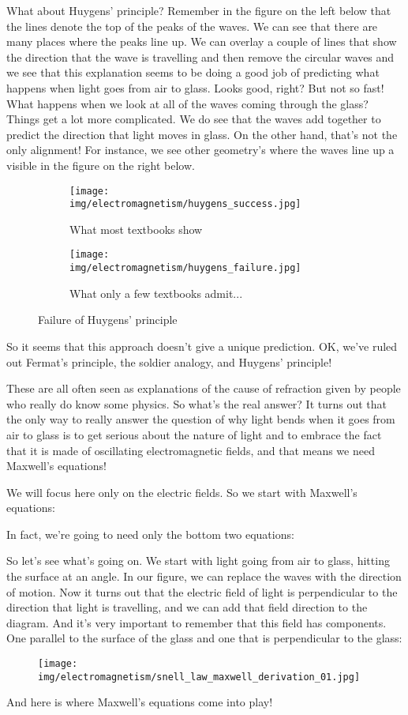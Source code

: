 	What about Huygens' principle? Remember in the figure on the left below that the lines denote the top of the peaks of the waves. We can see that there are many places where the peaks line up. We can overlay a couple of lines that show the direction that the wave is travelling and then remove the circular waves and we see that this explanation seems to be doing a good job of predicting what happens when light goes from air to glass. Looks good, right? But not so fast! What happens when we look at all of the waves coming through the glass? Things get a lot more complicated. We do see that the waves add together to predict the direction that light moves in glass. On the other hand, that's not the only alignment! For instance, we see other geometry's where the waves line up a visible in the figure on the right below. 
	\begin{figure}[H]
		\centering
		\begin{subfigure}{0.5\textwidth}
			\texttt{[image: img/electromagnetism/huygens\_success.jpg]}
			\caption[]{What most textbooks show}
		\end{subfigure}
		\begin{subfigure}{0.485\textwidth}
			\texttt{[image: img/electromagnetism/huygens\_failure.jpg]}
			\caption[]{What only a few textbooks admit...}
		\end{subfigure}		
		\caption{Failure of Huygens' principle}		
	\end{figure}
	So it seems that this approach doesn't give a unique prediction. OK, we've ruled out Fermat's principle, the soldier analogy, and Huygens' principle! 
	
	These are all often seen as explanations of the cause of refraction given by people who really do know some physics. So what's the real answer? It turns out that the only way to really answer the question of why light bends when it goes from air to glass is to get serious about the nature of light and to embrace the fact that it is made of oscillating electromagnetic fields, and that means we need Maxwell's equations! 
	
	We will focus here only on the electric fields. So we start with Maxwell's equations:
	
	In fact, we're going to need only the bottom two equations:
		
	So let's see what's going on. We start with light going from air to glass, hitting the surface at an angle. In our figure, we can replace the waves with the direction of motion. Now it turns out that the electric field of light is perpendicular to the direction that light is travelling, and we can add that field direction to the diagram. And it's very important to remember that this field has components. One parallel to the surface of the glass and one that is perpendicular to the glass:
	\begin{figure}[H]
		\centering
		\texttt{[image: img/electromagnetism/snell\_law\_maxwell\_derivation\_01.jpg]}
	\end{figure}
	And here is where Maxwell's equations come into play! 

